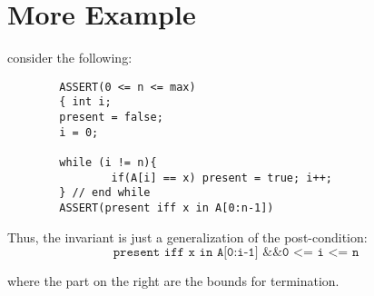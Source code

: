 \documentclass[12pt]{book}
\begin{document}
\section*{More Example}
consider the following:
\begin{verbatim}
        ASSERT(0 <= n <= max)
        { int i;
        present = false;
        i = 0;

        while (i != n){
                if(A[i] == x) present = true; i++;
        } // end while
        ASSERT(present iff x in A[0:n-1])
\end{verbatim}

Thus, the invariant is just a generalization of the post-condition:
\[\texttt{present iff x in A[0:i-1] \&\& 0 <= i <= n}\]

where the part on the right are the bounds for termination.
\end{document}
